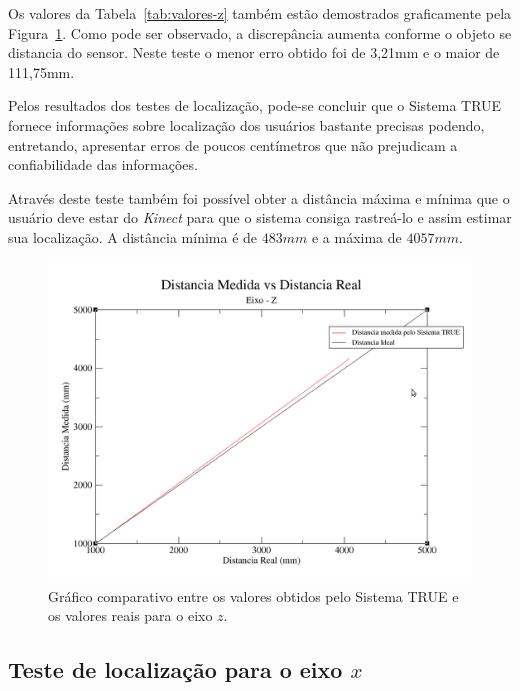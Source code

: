 	Os valores da Tabela~\ref{tab:valores-z} também estão demostrados graficamente
	pela Figura~\ref{fig:grafico-z}. Como pode ser observado, a discrepância
	aumenta conforme o objeto se distancia do sensor. Neste teste o menor erro
	obtido foi de 3,21mm e o maior de 111,75mm.
	
	Pelos resultados dos testes de localização, pode-se concluir que o
	Sistema TRUE fornece informações sobre localização dos usuários bastante
	precisas podendo, entretando, apresentar erros de poucos centímetros que não
	prejudicam a confiabilidade das informações.

	Através deste teste também foi possível obter a distância máxima e mínima que o
	usuário deve estar do \textit{Kinect} para que o sistema consiga rastreá-lo e
	assim estimar sua localização. A distância mínima é de $\displaystyle 483mm$
	e a máxima de $\displaystyle 4057mm$.

	\begin{figure}[H]
		\begin{center}
			\includegraphics[scale=0.4]{figuras/5.Testes/grafico-eixo-z.png}
		\end{center}
		\caption{Gráfico comparativo entre os valores obtidos pelo Sistema TRUE e os
		valores reais para o eixo $\displaystyle z$.}
		\label{fig:grafico-z}
	\end{figure}

\subsection{Teste de localização para o eixo $\displaystyle x$}

